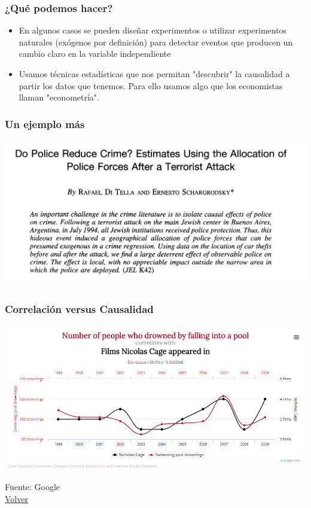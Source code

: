 \documentclass{beamer}
\begin{document}
\begin{frame} 
\frametitle{¿Qué podemos hacer?}
\begin{itemize}

    \item  En algunos casos se pueden diseñar experimentos o utilizar experimentos naturales (exógenos por definición) para detectar eventos que producen un cambio claro en la variable independiente
     \item Usamos técnicas estadísticas que nos permitan "descubrir" la causalidad a partir los datos que tenemos. Para ello usamos algo que los economistas llaman "econometría". 
\end{itemize}
\end{frame}

\begin{frame} 
\frametitle{Un ejemplo más}
\begin{center}
    \includegraphics[scale=0.12]{Slides Principios de Economia/Figures/Introduccion_1.7_Dopolice.jpg}
\end{center}
\end{frame}

\begin{frame} \label{hdos}
\frametitle{Correlación versus Causalidad}
\begin{center}
    \includegraphics[scale=0.3]{Slides Principios de Economia/Figures/Introduccion_1.4.1_corrcaus.png}
\end{center}
Fuente: Google \\
\hyperlink{uno}{Volver} 
\end{frame}
\end{document}
